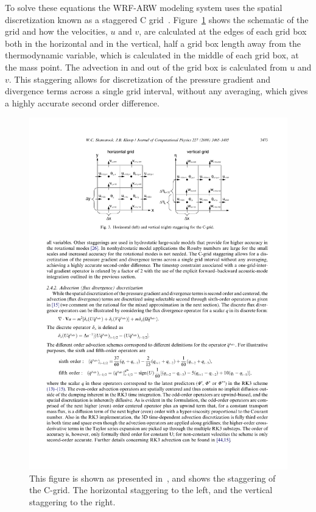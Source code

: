 To solve these equations the WRF-ARW modeling system uses the spatial discretization known as a staggered C grid~\citep{Skamarock2008a}. Figure~\ref{fig:stagger} shows the schematic of the grid and how the velocities, $u$ and $v$, are calculated at the edges of each grid box both in the horizontal and in the vertical, half a grid box length away from the thermodynamic variable, which is calculated in the middle of each grid box, at the mass point. The advection in and out of the grid box is calculated from $u$ and $v$. This staggering allows for discretization of the pressure gradient and divergence terms across a single grid interval, without any averaging, which gives a highly accurate second order difference.

\begin{figure}[ht]
\centering
\includegraphics[width=\textwidth]{model_methods/gridstagger.pdf}
\caption{This figure is shown as presented in~\citet{Skamarock2008}, and shows the staggering of the C-grid. The horizontal staggering to the left, and the vertical staggering to the right.}
\label{fig:stagger}
\end{figure}

